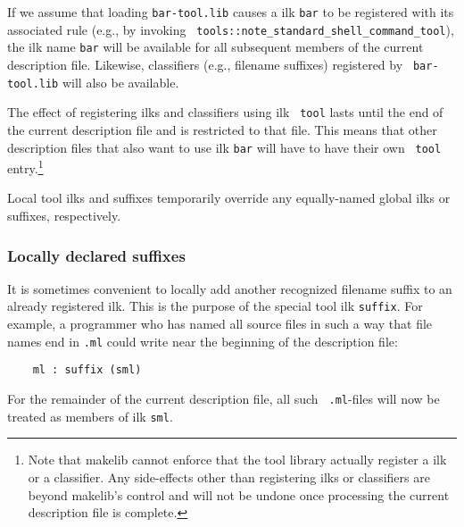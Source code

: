 If we assume that loading {\tt bar-tool.lib} causes a ilk {\tt bar}
to be registered with its associated rule (e.g., by invoking {\tt
tools::note_standard_shell_command_tool}), the ilk name {\tt bar} will be
available for all subsequent members of the current description file.
Likewise, classifiers (e.g., filename suffixes) registered by {\tt
bar-tool.lib} will also be available.

The effect of registering ilks and classifiers using ilk {\tt
tool} lasts until the end of the current description file and is
restricted to that file.  This means that other description files that
also want to use ilk {\tt bar} will have to have their own {\tt
tool} entry.\footnote{Note that makelib cannot enforce that the tool
library actually register a ilk or a classifier.  Any side-effects
other than registering ilks or classifiers are beyond makelib's control
and will not be undone once processing the current description file is
complete.}

Local tool ilks and suffixes temporarily override any equally-named
global ilks or suffixes, respectively.

\subsubsection{Locally declared suffixes}
\label{sec:localsuffixes}

It is sometimes convenient to locally add another recognized filename
suffix to an already registered ilk.  This is the purpose of the
special tool ilk {\tt suffix}.  For example, a programmer who has
named all source files in such a way that file names end in {\tt .ml}
could write near the beginning of the description file:

\begin{verbatim}
    ml : suffix (sml)
\end{verbatim}

For the remainder of the current description file, all such {\tt
.ml}-files will now be treated as members of ilk {\tt sml}.
